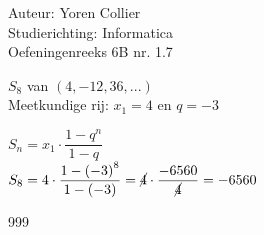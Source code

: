 \documentclass[a4paper]{article}
\newcommand{\Lh}{\left(} %
\newcommand{\Rh}{\right)}
\newcommand{\schrap}{\cancel}
\begin{document}
\noindent \large Auteur: Yoren Collier \\
\noindent \large Studierichting: Informatica\\
\noindent \large Oefeningenreeks 6B nr. 1.7\\

\medskip

\normalsize

$S_{8}$ van $\Lh 4, -12, 36, ... \Rh$\\

Meetkundige rij: $x_1 = 4$ en $q = -3$

$S_n = x_1 \cdot \dfrac{1 - q^n}{1 - q}$\\

$S_8 = 4 \cdot \dfrac{1 - \Lh -3 \Rh^8}{1 - \Lh -3 \Rh} = \schrap{4} \cdot \dfrac{-6560}{\schrap{4}} = -6560$\\

\begin{thebibliography}{999}
\end{thebibliography}
\end{document}
